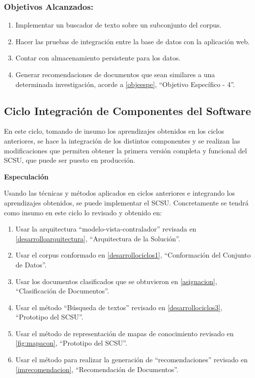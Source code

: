 \documentclass[
  12pt,
  openany]{book}
\begin{document}
\hypertarget{objetivos-alcanzados-1}{%
\subsubsection{Objetivos Alcanzados:}\label{objetivos-alcanzados-1}}

\begin{enumerate}
\def\labelenumi{\arabic{enumi}.}
\item
  Implementar un buscador de texto sobre un subconjunto del corpus.
\item
  Hacer las pruebas de integración entre la base de datos con la aplicación web.
\item
  Contar con almacenamiento persistente para los datos.
\item
  Generar recomendaciones de documentos que sean similares a una determinada investigación, acorde a \ref{objeespe}, ``Objetivo Específico - 4''.
\end{enumerate}

\newpage

\hypertarget{desarrollociclos4}{%
\subsection{Ciclo Integración de Componentes del Software}\label{desarrollociclos4}}

En este ciclo, tomando de insumo los aprendizajes obtenidos en los ciclos anteriores, se hace la integración de los distintos componentes y se realizan las modificaciones que permiten obtener la primera versión completa y funcional del SCSU, que puede ser puesto en producción.

\textbf{Especulación}

Usando las técnicas y métodos aplicados en ciclos anteriores e integrando los aprendizajes obtenidos, se puede implementar el SCSU. Concretamente se tendrá como insumo en este ciclo lo revisado y obtenido en:

\begin{enumerate}
\def\labelenumi{\arabic{enumi}.}
\item
  Usar la arquitectura ``modelo-vista-contralador'' revisada en \ref{desarrolloarquitectura}, ``Arquitectura de la Solución''.
\item
  Usar el corpus conformado en \ref{desarrollociclos1}, ``Conformación del Conjunto de Datos''.
\item
  Usar los documentos clasificados que se obtuvieron en \ref{asignacion}, ``Clasificación de Documentos''.
\item
  Usar el método ``Búsqueda de textos'' revisado en \ref{desarrollociclos3}, ``Prototipo del SCSU''.
\item
  Usar el método de representación de mapas de conocimiento revisado en \ref{fig:mapacon}, ``Prototipo del SCSU''.
\item
  Usar el método para realizar la generación de ``recomendaciones'' revisado en \ref{imrecomendacion}, ``Recomendación de Documentos''.
\end{enumerate}
\end{document}
